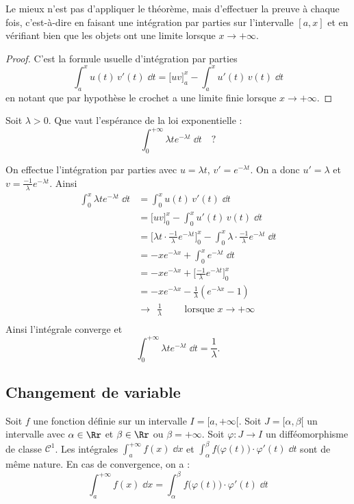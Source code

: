 \documentclass[class=report,crop=false]{standalone}
\begin{document}
Le mieux n'est pas d'appliquer le théorème, mais d'effectuer la preuve à chaque fois,
c'est-à-dire en faisant une intégration par parties sur l'intervalle $[a,x]$ et
en vérifiant bien que les objets ont une limite lorsque $x\to+ \infty$.

\begin{proof}
C'est la formule usuelle d'intégration par parties 
$$\int_a^{x} u(t) \, v'(t)\;\dd t 
= \big[uv\big]_a^{x} - \int_a^{x} u'(t) \, v(t)\;\dd t$$
en notant que par hypothèse le crochet a une limite finie lorsque $x\to +\infty$.
\end{proof}


\begin{exemple}
Soit $\lambda > 0$. Que vaut l'espérance de la loi exponentielle :
$$\int_0^{+\infty} \lambda t e^{-\lambda t}\;\dd t \quad \text{?}$$

On effectue l'intégration par parties avec $u = \lambda t$, $v' = e^{-\lambda t}$.
On a donc $u' = \lambda$ et $v = \frac{-1}{\lambda}e^{-\lambda t}$.
Ainsi
\begin{align*}
\int_0^{x} \lambda t e^{-\lambda t}\;\dd t 
 & = \int_0^{x} u(t) \, v'(t)\;\dd t  \\
 & = \big[uv\big]_0^{x} - \int_0^{x} u'(t) \, v(t)\;\dd t \\
 & = \Big[ \lambda t \cdot \frac{-1}{\lambda}e^{-\lambda t}\Big]_0^{x} 
 - \int_0^{x} \lambda \cdot  \frac{-1}{\lambda}e^{-\lambda t}\;\dd t \\
 & = -xe^{-\lambda x} + \int_0^{x} e^{-\lambda t} \;\dd t\\
 & = -xe^{-\lambda x} + \Big[\frac{-1}{\lambda}e^{-\lambda t}\Big]_0^{x} \\
 & = -xe^{-\lambda x}-\frac{1}{\lambda} \left(e^{-\lambda x} -1\right) \\
 & \longrightarrow \ \  \frac{1}{\lambda} \qquad \text{ lorsque } x \to +\infty \\
\end{align*}
Ainsi l'intégrale converge et 
$$\int_0^{+\infty} \lambda t e^{-\lambda t}\;\dd t = \frac{1}{\lambda}.$$
\end{exemple}



\subsection{Changement de variable}

\begin{theoreme}
Soit $f$ une fonction définie sur un intervalle $I = [a,+\infty[$. Soit
$J= [\alpha,\beta[$ un intervalle avec $\alpha\in \Rr$ et $\beta\in \Rr$ ou $\beta=+\infty$. 
Soit $\varphi : J \to I$ un difféomorphisme de classe $\mathcal{C}^1$. 
Les intégrales $\int_{a}^{+\infty} f(x) \;\dd x$ et
$\int_\alpha^\beta f\big(\varphi(t)\big)\cdot\varphi'(t) \;\dd t$ sont de même nature.
En cas de convergence, on a :
$$\int_{a}^{+\infty} f(x) \;\dd x = \int_\alpha^\beta f\big(\varphi(t)\big)\cdot\varphi'(t) \;\dd t$$
\end{theoreme} 
\end{document}

